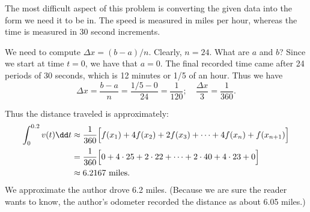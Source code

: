\begin{example}
The most difficult aspect of this problem is converting the given data into the form we need it to be in. The speed is measured in miles per hour, whereas the time is measured in 30 second increments.

We need to compute $\Delta x = (b-a)/n$. Clearly, $n=24$. What are $a$ and $b$? Since we start at time $t=0$, we have that $a=0$. The final recorded time came after 24 periods of 30 seconds, which is 12 minutes or 1/5 of an hour. Thus we have
\[\Delta x = \frac{b-a}{n} = \frac{1/5-0}{24} = \frac1{120}; \quad \frac{\Delta x}{3} = \frac{1}{360}.\]

Thus the distance traveled is approximately:
\begin{align*}
\int_0^{0.2}v(t)\dd t &\approx \frac{1}{360}\Bigl[f(x_1)+4f(x_2) + 2f(x_3) + \dots + 4f(x_n)+f(x_{n+1})\Bigr]\\
					&= \frac{1}{360}\Bigl[0+4\cdot25+2\cdot 22 + \dots + 2\cdot40+4\cdot 23 + 0\Bigr]\\
					&\approx 6.2167 \ \text{miles.}
\end{align*}
We approximate the author drove 6.2 miles. (Because we are sure the reader wants to know, the author's odometer recorded the distance as about 6.05 miles.)
\end{example}

%
%

